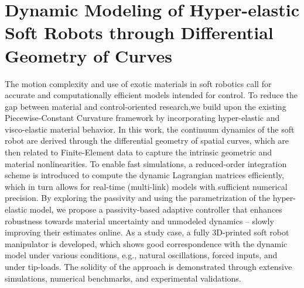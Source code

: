 \graphicspath{{2_Chapter/}}
\chapter{Dynamic Modeling of Hyper-elastic Soft Robots through Differential Geometry of Curves}
\label{chap:2}

\begin{chapter-abstract}
The motion complexity and use of exotic materials in soft robotics call for accurate and computationally efficient models intended for control. To reduce the gap between material and control-oriented research,we build upon the existing Piecewise-Constant Curvature framework by incorporating hyper-elastic and visco-elastic material behavior. In this work, the continuum dynamics of the soft robot are derived through the differential geometry of spatial curves, which are then related to Finite-Element data to capture the intrinsic geometric and material nonlinearities. To enable fast simulations, a reduced-order integration scheme is introduced to compute the dynamic Lagrangian matrices efficiently, which in turn allows for real-time (multi-link) models with sufficient numerical precision. By exploring the passivity and using the parametrization of the hyper-elastic model, we propose a passivity-based adaptive controller that enhances robustness towards material uncertainty and unmodeled dynamics -- slowly improving their estimates online. As a study case, a fully 3D-printed soft robot manipulator is developed, which shows good correspondence with the dynamic model under various conditions, e.g., natural oscillations, forced inputs, and under tip-loads. The solidity of the approach is demonstrated through extensive simulations, numerical benchmarks, and experimental validations.

\end{chapter-abstract}

\vspace{30mm}

\clearpage
\Materialtrue %
%

%
%
%
%
